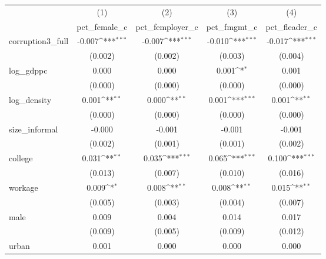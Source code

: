 {
\def\sym#1{\ifmmode^{#1}\else\(^{#1}\)\fi}
\begin{tabular}{l*{4}{c}}
\hline\hline
            &\multicolumn{1}{c}{(1)}&\multicolumn{1}{c}{(2)}&\multicolumn{1}{c}{(3)}&\multicolumn{1}{c}{(4)}\\
            &\multicolumn{1}{c}{pct\_female\_c}&\multicolumn{1}{c}{pct\_femployer\_c}&\multicolumn{1}{c}{pct\_fmgmt\_c}&\multicolumn{1}{c}{pct\_fleader\_c}\\
\hline
corruption3\_full&      -0.007\sym{***}&      -0.007\sym{***}&      -0.010\sym{***}&      -0.017\sym{***}\\
            &     (0.002)         &     (0.002)         &     (0.003)         &     (0.004)         \\
[1em]
log\_gdppc   &       0.000         &       0.000         &       0.001\sym{*}  &       0.001         \\
            &     (0.000)         &     (0.000)         &     (0.000)         &     (0.000)         \\
[1em]
log\_density &       0.001\sym{**} &       0.000\sym{**} &       0.001\sym{***}&       0.001\sym{**} \\
            &     (0.000)         &     (0.000)         &     (0.000)         &     (0.000)         \\
[1em]
size\_informal&      -0.000         &      -0.001         &      -0.001         &      -0.001         \\
            &     (0.002)         &     (0.001)         &     (0.001)         &     (0.002)         \\
[1em]
college     &       0.031\sym{**} &       0.035\sym{***}&       0.065\sym{***}&       0.100\sym{***}\\
            &     (0.013)         &     (0.007)         &     (0.010)         &     (0.016)         \\
[1em]
workage     &       0.009\sym{*}  &       0.008\sym{**} &       0.008\sym{**} &       0.015\sym{**} \\
            &     (0.005)         &     (0.003)         &     (0.004)         &     (0.007)         \\
[1em]
male        &       0.009         &       0.004         &       0.014         &       0.017         \\
            &     (0.009)         &     (0.005)         &     (0.009)         &     (0.012)         \\
[1em]
urban       &       0.001         &       0.000         &       0.000         &       0.000         \\

\end{tabular}}
